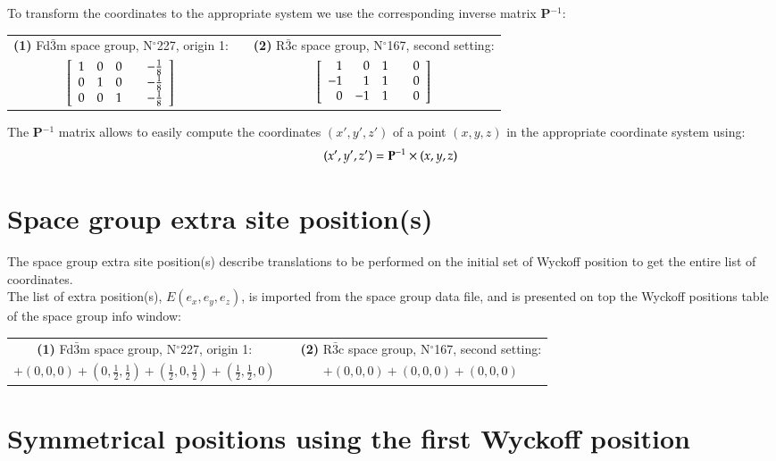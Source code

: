 To transform the coordinates to the appropriate system we use the corresponding inverse matrix  {\bf{P}}$^{-1}$: \\[0.25cm]
\begin{tabular}{cp{1cm}c}
{\bf{(1)}} Fd$\bar{3}$m space group, N$^\circ$227, origin 1: & & {\bf{(2)}} R$\bar{3}$c space group, N$^\circ$167, second setting: \\[0.25cm]
$\left[\begin{array}{rrrr} 1 & 0 & 0 & \quad -\frac{1}{8} \\ 0 & 1 & 0 & \quad -\frac{1}{8} \\ 0 & 0 & 1 & \quad -\frac{1}{8} \end{array}\right]$ & &
$\left[\begin{array}{rrrr} 1 & 0 & 1 & \quad 0 \\ -1 & 1 & 1 & \quad 0 \\ 0 & -1 & 1 & \quad 0 \end{array}\right]$ \\[0.25cm]
\end{tabular}
The  {\bf{P}}$^{-1}$ matrix allows to easily compute the coordinates $(x',y',z')$ of a point $(x,y,z)$ in the appropriate coordinate system using:
\begin{equation}
\label{sgconv}	(x',y',z') = {\bf{P}}^{-1} \times (x,y,z)
\end{equation}

\section*{Space group extra site position(s)}

The space group extra site position(s) describe translations to be performed on the initial set of Wyckoff position to get the entire list of coordinates. \\
The list of extra position(s), $E(e_x,e_y,e_z)$, is imported from the space group data file, 
and is presented on top the Wyckoff positions table of the space group info window:\\[0.25cm]
\begin{tabular}{cp{1cm}c}
{\bf{(1)}} Fd$\bar{3}$m space group, N$^\circ$227, origin 1: & & {\bf{(2)}} R$\bar{3}$c space group, N$^\circ$167, second setting: \\[0.25cm]
	$+ (0,0,0) + (0,\frac{1}{2},\frac{1}{2}) + (\frac{1}{2},0,\frac{1}{2}) +  (\frac{1}{2},\frac{1}{2},0)$ & & $+ (0,0,0) + (0,0,0) + (0,0,0)$ \\
\end{tabular}

\section*{Symmetrical positions using the first Wyckoff position}

